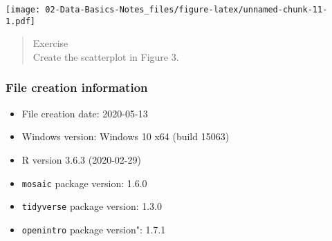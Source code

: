 \documentclass[
]{article}
\newenvironment{Shaded}{\begin{snugshade}}{\end{snugshade}}
\newcommand{\DataTypeTok}[1]{\textcolor[rgb]{0.13,0.29,0.53}{#1}}
\newcommand{\DecValTok}[1]{\textcolor[rgb]{0.00,0.00,0.81}{#1}}
\newcommand{\FloatTok}[1]{\textcolor[rgb]{0.00,0.00,0.81}{#1}}
\newcommand{\KeywordTok}[1]{\textcolor[rgb]{0.13,0.29,0.53}{\textbf{#1}}}
\newcommand{\NormalTok}[1]{#1}
\newcommand{\OperatorTok}[1]{\textcolor[rgb]{0.81,0.36,0.00}{\textbf{#1}}}
\newcommand{\StringTok}[1]{\textcolor[rgb]{0.31,0.60,0.02}{#1}}
\providecommand{\tightlist}{%
  \setlength{\itemsep}{0pt}\setlength{\parskip}{0pt}}
\begin{document}
\begin{Shaded}
\end{Shaded}

\texttt{[image: 02-Data-Basics-Notes\_files/figure-latex/unnamed-chunk-11-1.pdf]}

\begin{quote}
Exercise\\
Create the scatterplot in Figure 3.
\end{quote}

\hypertarget{file-creation-information}{%
\subsubsection{File creation
information}\label{file-creation-information}}

\begin{itemize}
\tightlist
\item
  File creation date: 2020-05-13
\item
  Windows version: Windows 10 x64 (build 15063)
\item
  R version 3.6.3 (2020-02-29)
\item
  \texttt{mosaic} package version: 1.6.0
\item
  \texttt{tidyverse} package version: 1.3.0
\item
  \texttt{openintro} package version": 1.7.1
\end{itemize}
\end{document}
